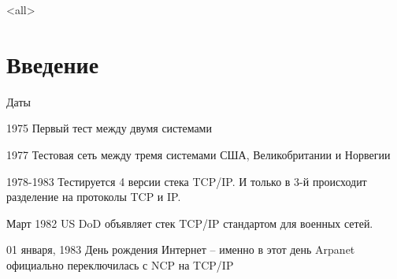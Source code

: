 

\subtitle[TCP/IP]{Стек протоколов TCP/IP}



\mode<all>{}

%
%
\section{Введение}

\begin{frame}{Даты}
	\begin{block}{1975}
	Первый тест между двумя системами
	\end{block}
	\pause
	\begin{block}{1977}
	Тестовая сеть между тремя системами США, Великобритании и Норвегии
	\end{block}
	\pause
	\begin{block}{1978-1983}
	Тестируется 4 версии стека TCP/IP. И только в 3-й происходит разделение на протоколы TCP и IP.
	\end{block}
	\pause
	\begin{block}{Март 1982}
	US DoD объявляет стек TCP/IP стандартом для военных сетей.
	\end{block}
	\pause
	\begin{block}{01 января,  1983}
	День рождения Интернет -- именно в этот день Arpanet официально переключилась с NCP на TCP/IP 
	\end{block}
\end{frame}



